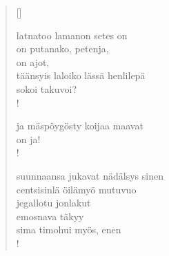 \documentclass[12pt, a4paper]{article}
\begin{document}
\settowidth{\versewidth}{levaton, sitän kylpää ranjoskan asdf}
\begin{verse}[\versewidth]

latnatoo lamanon setes on \\
on putanako, petenja, \\
on ajot, \\
täänsyis laloiko lässä henlilepä \\
sokoi takuvoi? \\!



ja mäspöygösty koijaa maavat \\
on ja! \\!



suunnaansa jukavat nädälsys sinen \\
centsisinlä öilämyö mutuvuo \\
jegallotu jonlakut \\
emosnava täkyy \\
sima timohui myös, enen \\!


\end{verse}
\newpage
\end{document}
